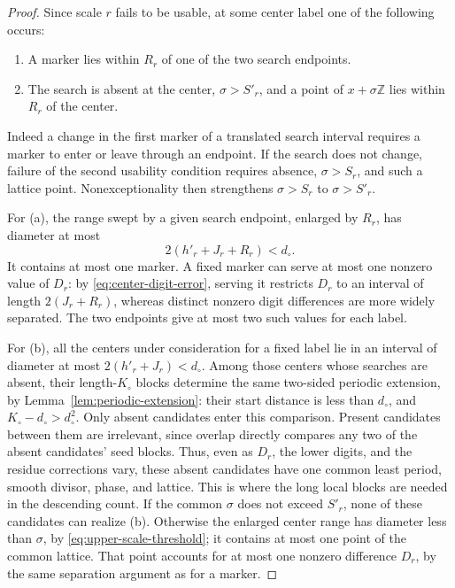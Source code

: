 \begin{proof}
Since scale $r$ fails to be usable, at some center label one of the
following occurs:
\begin{enumerate}[label=(\alph*)]
\item A marker lies within $R_r$ of one of the two search endpoints.
\item The search is absent at the center, $\sigma>S'_r$, and a point
of $x+\sigma\mathbb Z$ lies within $R_r$ of the center.
\end{enumerate}
Indeed a change in the first marker of a translated search interval
requires a marker to enter or leave through an endpoint.  If the
search does not change, failure of the second usability condition
requires absence, $\sigma>S_r$, and such a lattice point.
Nonexceptionality then strengthens $\sigma>S_r$ to $\sigma>S'_r$.

For (a), the range swept by a given search endpoint, enlarged by
$R_r$, has diameter at most
\begin{equation}\label{eq:swept-range}
                  2(h'_r+J_r+R_r)<d_\circ.
\end{equation}
It contains at most one marker.  A fixed marker can serve at most
one nonzero value of $D_r$: by \eqref{eq:center-digit-error}, serving
it restricts $D_r$ to an interval of length $2(J_r+R_r)$, whereas
distinct nonzero digit differences are more widely separated.
The two endpoints give at most two such values for each label.

For (b), all the centers under consideration for a fixed label lie
in an interval of diameter at most $2(h'_r+J_r)<d_\circ$.
Among those centers whose searches are absent, their length-$K_\circ$
blocks determine the same two-sided periodic extension, by
Lemma~\ref{lem:periodic-extension}: their start distance is less than
$d_\circ$, and $K_\circ-d_\circ>d_\circ^2$. Only absent candidates enter
this comparison. Present candidates between them are irrelevant, since
overlap directly compares any two of the absent candidates' seed blocks.
Thus, even as $D_r$, the lower digits, and the residue corrections vary, these absent candidates have one
common least period, smooth divisor, phase, and lattice.  This is
where the long local blocks are needed in the descending count.
If the common $\sigma$ does not exceed $S'_r$, none of these candidates
can realize (b).  Otherwise the enlarged center range has diameter
less than $\sigma$, by \eqref{eq:upper-scale-threshold}; it contains
at most one point of the common lattice.  That point accounts for
at most one nonzero difference $D_r$, by the same separation argument
as for a marker.


\end{proof}
